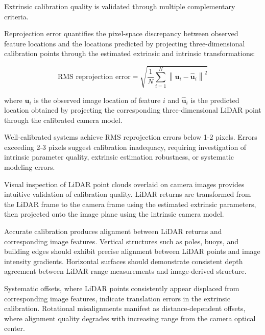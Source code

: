 
Extrinsic calibration quality is validated through multiple complementary criteria.


Reprojection error quantifies the pixel-space discrepancy between observed feature locations and the locations predicted by projecting three-dimensional calibration points through the estimated extrinsic and intrinsic transformations:

\begin{equation}
    \text{RMS reprojection error} = \sqrt{\frac{1}{N}\sum_{i=1}^{N} \left\| \mathbf{u}_i - \hat{\mathbf{u}}_i \right\|^2} 
\end{equation}

where $\mathbf{u}_i$ is the observed image location of feature $i$ and $\hat{\mathbf{u}}_i$ is the predicted location obtained by projecting the corresponding three-dimensional LiDAR point through the calibrated camera model.

Well-calibrated systems achieve RMS reprojection errors below 1-2 pixels.
Errors exceeding 2-3 pixels suggest calibration inadequacy, requiring investigation of intrinsic parameter quality, extrinsic estimation robustness, or systematic modeling errors.


Visual inspection of LiDAR point clouds overlaid on camera images provides intuitive validation of calibration quality.
LiDAR returns are transformed from the LiDAR frame to the camera frame using the estimated extrinsic parameters, then projected onto the image plane using the intrinsic camera model.

Accurate calibration produces alignment between LiDAR returns and corresponding image features.
Vertical structures such as poles, buoys, and building edges should exhibit precise alignment between LiDAR points and image intensity gradients.
Horizontal surfaces should demonstrate consistent depth agreement between LiDAR range measurements and image-derived structure.

Systematic offsets, where LiDAR points consistently appear displaced from corresponding image features, indicate translation errors in the extrinsic calibration.
Rotational misalignments manifest as distance-dependent offsets, where alignment quality degrades with increasing range from the camera optical center.


